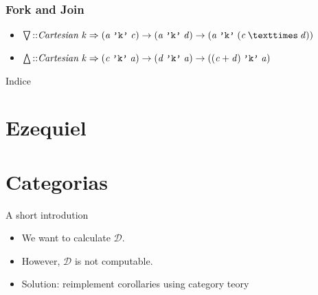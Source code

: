 \documentclass{beamer}
\newcommand{\Conid}[1]{\mathit{#1}}
\newcommand{\Varid}[1]{\mathit{#1}}
\newenvironment{slide}[1]{\begin{frame}\frametitle{#1}}{\end{frame}}
\begin{document}
\begin{slide}{Fork and Join}
    \begin{itemize}
        \item
            \ensuremath{ \bigtriangledown \mathbin{::}\Conid{Cartesian}\;\Varid{k}\Rightarrow(\Varid{a}\;\text{\tt 'k'}\;\Varid{c})\rightarrow (\Varid{a}\;\text{\tt 'k'}\;\Varid{d})\rightarrow (\Varid{a}\;\text{\tt 'k'}\;(\Varid{c}\mathbin{×}\Varid{d}))}
        \item
            \ensuremath{ \bigtriangleup \mathbin{::}\Conid{Cartesian}\;\Varid{k}\Rightarrow(\Varid{c}\;\text{\tt 'k'}\;\Varid{a})\rightarrow (\Varid{d}\;\text{\tt 'k'}\;\Varid{a})\rightarrow ((\Varid{c}\mathbin{+}\Varid{d})\;\text{\tt 'k'}\;\Varid{a})}
    \end{itemize}
\end{slide}

\begin{frame}
  \titlepage
\end{frame}

\begin{frame}{Indice}
  \tableofcontents
\end{frame}





















\section{Ezequiel}


\section{Categorias}

\begin{frame}{A short introdution}
\begin{itemize}
 \item<1-> We want to calculate \ensuremath{\mathcal{D}}.
 \item<2-> However, \ensuremath{\mathcal{D}} is not computable.
 \item<3-> Solution: reimplement corollaries using category teory
\end{itemize}

\end{frame}
\end{document}
